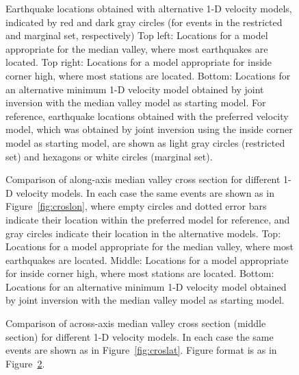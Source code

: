 \documentclass[jgr]{agu2001}
\newlength{\tw}
\begin{document}
\begin{figure}

\setlength{\figarrwidth}{0.5\tw}



\caption{Earthquake locations obtained with alternative 1-D velocity
models, indicated by  red and dark gray circles (for events in the
restricted and marginal set, respectively)
Top left: Locations for a model appropriate for the median valley, where most
earthquakes are located. 
Top right: Locations for a model appropriate for inside corner high, where most
stations are located. 
Bottom: Locations for an alternative minimum 1-D velocity model
obtained by joint inversion with the median valley model as starting
model.
  For reference, earthquake locations obtained with the
preferred velocity model, which was obtained by joint inversion using
the inside corner model as starting model, are shown as 
 light gray circles  (restricted set) and hexagons or white circles
(marginal set). }
\label{fig:mapvar}
\end{figure}


\begin{figure}




\caption{Comparison of along-axis median valley cross section for different 1-D velocity
models.  In each case the same events are shown as in
Figure~\ref{fig:croslon}, where empty circles and dotted error bars
indicate their location within the preferred model for reference, and
gray circles indicate their location in the alternative models.
Top: Locations for a model appropriate for the median valley, where most
earthquakes are located. 
Middle: Locations for a model appropriate for inside corner high, where most
stations are located. 
Bottom: Locations for an alternative minimum 1-D velocity model
obtained by joint inversion with the median valley model as starting
model.}
\label{fig:croslonvar}
\end{figure}

\begin{figure}




\caption{Comparison of across-axis median valley cross section (middle
section) for different 1-D velocity
models.  In each case the same events are shown as in
Figure~\ref{fig:croslat}.  Figure format is as in Figure~\ref{fig:croslonvar}.}
\label{fig:croslatvar}
\end{figure}
\end{document}
